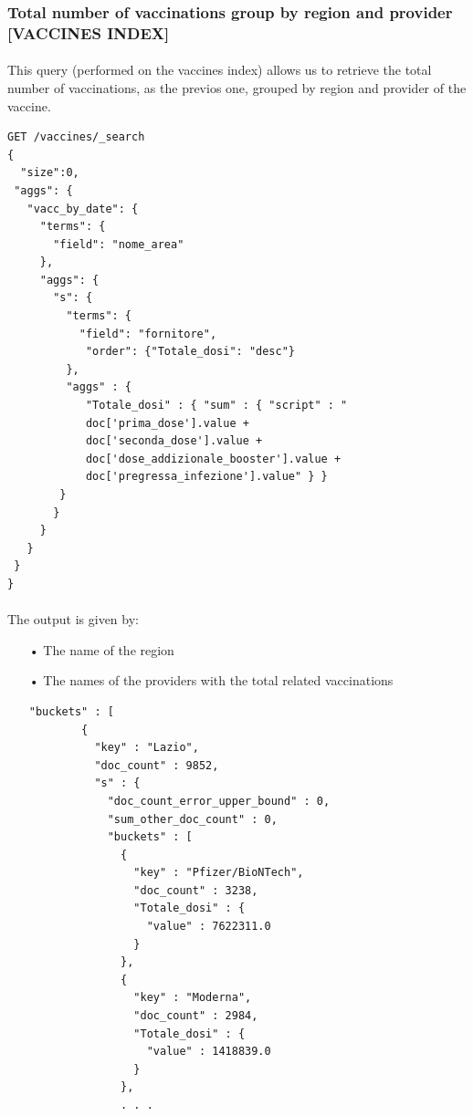 \documentclass[a4paper,12pt]{article}
\begin{document}
\subsubsection{Total number of vaccinations group by region and provider [VACCINES INDEX]}
\paragraph{} This query (performed on the vaccines index) allows us to retrieve the total number of vaccinations, as the previos one, grouped by region and provider of the vaccine.
\begin{tcolorbox}[colback=green!5!white,colframe=green!75!black,title=QUERY]
\begin{verbatim}
GET /vaccines/_search
{
  "size":0,
 "aggs": {
   "vacc_by_date": {
     "terms": {
       "field": "nome_area"
     },
     "aggs": {
       "s": {
         "terms": {
           "field": "fornitore",
            "order": {"Totale_dosi": "desc"}
         },
         "aggs" : {
            "Totale_dosi" : { "sum" : { "script" : "
            doc['prima_dose'].value + 
            doc['seconda_dose'].value + 
            doc['dose_addizionale_booster'].value + 
            doc['pregressa_infezione'].value" } }
        }
       }
     }
   }
 }
}
\end{verbatim}
\end{tcolorbox}
\paragraph{} The output is given by: 
\begin{itemize}[noitemsep]
\item[•] The name of the region
\item[•] The names of the providers with the total related vaccinations
\begin{tcolorbox}[colback=red!5!white,colframe=red!75!black,title=OUTPUT]
\begin{verbatim}
"buckets" : [
        {
          "key" : "Lazio",
          "doc_count" : 9852,
          "s" : {
            "doc_count_error_upper_bound" : 0,
            "sum_other_doc_count" : 0,
            "buckets" : [
              {
                "key" : "Pfizer/BioNTech",
                "doc_count" : 3238,
                "Totale_dosi" : {
                  "value" : 7622311.0
                }
              },
              {
                "key" : "Moderna",
                "doc_count" : 2984,
                "Totale_dosi" : {
                  "value" : 1418839.0
                }
              },
              . . .
\end{verbatim}
\end{tcolorbox}

\end{itemize}
\end{document}
